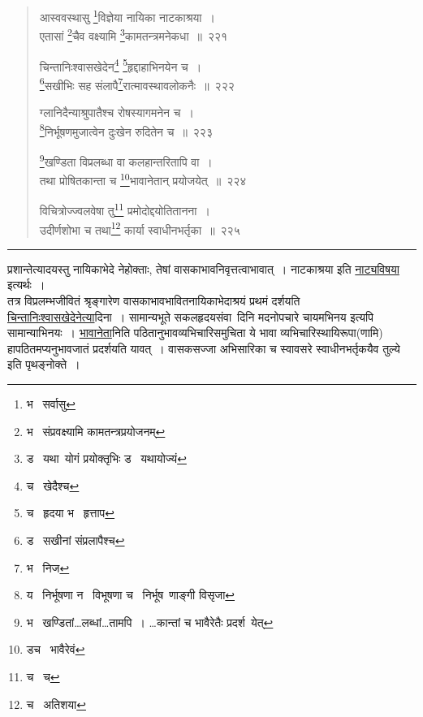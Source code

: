 \documentclass[11pt, openany]{book}
\begin{document}

\newpage
\lfoot{}

\begin{quote}
{\na आस्ववस्थासु \renewcommand{\thefootnote}{1}\footnote{भ \textendash\  सर्वासु}विज्ञेया नायिका नाटकाश्रया~।\\
एतासां \renewcommand{\thefootnote}{2}\footnote{भ \textendash\  संप्रवक्ष्यामि कामतन्त्रप्रयोजनम्}चैव वक्ष्यामि \renewcommand{\thefootnote}{3}\footnote{ड \textendash\  यथा\textendash\ योगं प्रयोक्तृभिः ड \textendash\  यथायोज्यं}कामतन्त्रमनेकधा~॥~२२१

चिन्तानिःश्वासखेदेन\renewcommand{\thefootnote}{4}\footnote{च \textendash\  खेदैश्च} \renewcommand{\thefootnote}{5}\footnote{च \textendash\  हृदया भ \textendash\  हृत्ताप}हृद्दाहाभिनयेन च~।\\
\renewcommand{\thefootnote}{6}\footnote{ड \textendash\  सखीनां संप्रलापैश्च}सखीभिः सह संलापै\renewcommand{\thefootnote}{7}\footnote{भ \textendash\  निज}रात्मावस्थावलोकनैः~॥~२२२

ग्लानिदैन्याश्रुपातैश्च रोषस्यागमनेन च~।\\
\renewcommand{\thefootnote}{8}\footnote{य \textendash\  निर्भूषणा न \textendash\  विभूषणा च \textendash\  निर्भूष\textendash\ णाङ्गी विसृजा}निर्भूषणमुजात्वेन दुःखेन रुदितेन च~॥~२२३

\renewcommand{\thefootnote}{9}\footnote{भ \textendash\  खण्डितां\ldots लब्धां\ldots तामपि~। \ldots कान्तां च भावैरेतैः प्रदर्श\textendash\ येत्}खण्डिता विप्रलब्धा वा कलहान्तरितापि वा~।\\
तथा प्रोषितकान्ता च \renewcommand{\thefootnote}{10}\footnote{डच \textendash\  भावैरेवं}भावानेतान् प्रयोजयेत्~॥~२२४

विचित्रोज्ज्वलवेषा तु\renewcommand{\thefootnote}{11}\footnote{च \textendash\  च} प्रमोदोद्दयोतितानना~।\\
उदीर्णशोभा च तथा\renewcommand{\thefootnote}{12}\footnote{च \textendash\  अतिशया} कार्या स्वाधीनभर्तृका~॥~२२५}
\end{quote}

\hrule

\vspace{2mm}
\noindent
प्रशान्तेत्यादयस्तु नायिकाभेदे नेहोक्ताः, तेषां वासकाभावनिवृत्तत्वाभावात्~। नाटकाश्रया इति \underline{नाट्यविषया} इत्यर्थः~।\\

तत्र विप्रलम्भजीवितं श्रृङ्गारेण वासकाभावभावितनायिकाभेदाश्रयं प्रथमं दर्शयति \underline{चिन्तानिःश्वासखेदेनेत्या}दिना~। सामान्यभूते सकलहृदयसंवा\textendash\ दिनि मदनोपचारे चायमभिनय इत्यपि सामान्याभिनयः~। \underline{भावानेता}निति पठितानुभावव्यभिचारिसमुचिता ये भावा व्यभिचारिस्थायिरूपा(णामि) हापठितमप्यनुभावजातं प्रदर्शयति यावत्~। वासकसज्जा अभिसारिका च स्वावसरे स्वाधीनभर्तृकयैव तुल्ये इति पृथङ्नोक्ते~।
\end{document}
